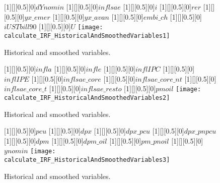  
\begin{figure}[H]
[1][][0.5][0]{$ dYnomin $}
[1][][0.5][0]{$ inflsae $}
[1][][0.5][0]{$ i $}
[1][][0.5][0]{$ rer $}
[1][][0.5][0]{$ yx\_emer $}
[1][][0.5][0]{$ yx\_avan $}
[1][][0.5][0]{$ embi\_ch $}
[1][][0.5][0]{$ iUSTbill90 $}
[1][][0.5][0]{$ U $}
\centering 
\texttt{[image: calculate\_IRF\_HistoricalAndSmoothedVariables1]}
\caption{Historical and smoothed variables.}\label{Fig:HistoricalAndSmoothedVariables:1}
\end{figure}

\begin{figure}[H]
[1][][0.5][0]{$ infla $}
[1][][0.5][0]{$ infle $}
[1][][0.5][0]{$ inflIPC $}
[1][][0.5][0]{$ inflIPE $}
[1][][0.5][0]{$ inflsae\_core $}
[1][][0.5][0]{$ inflsae\_core\_nt $}
[1][][0.5][0]{$ inflsae\_core\_t $}
[1][][0.5][0]{$ inflsae\_resto $}
[1][][0.5][0]{$ pmoil $}
\centering 
\texttt{[image: calculate\_IRF\_HistoricalAndSmoothedVariables2]}
\caption{Historical and smoothed variables.}\label{Fig:HistoricalAndSmoothedVariables:2}
\end{figure}

\begin{figure}[H]
[1][][0.5][0]{$ pcu $}
[1][][0.5][0]{$ dpx $}
[1][][0.5][0]{$ dpx\_pcu $}
[1][][0.5][0]{$ dpx\_pnpcu $}
[1][][0.5][0]{$ dpm $}
[1][][0.5][0]{$ dpm\_oil $}
[1][][0.5][0]{$ pm\_pnoil $}
[1][][0.5][0]{$ ynomin $}
\centering 
\texttt{[image: calculate\_IRF\_HistoricalAndSmoothedVariables3]}
\caption{Historical and smoothed variables.}\label{Fig:HistoricalAndSmoothedVariables:3}
\end{figure}


